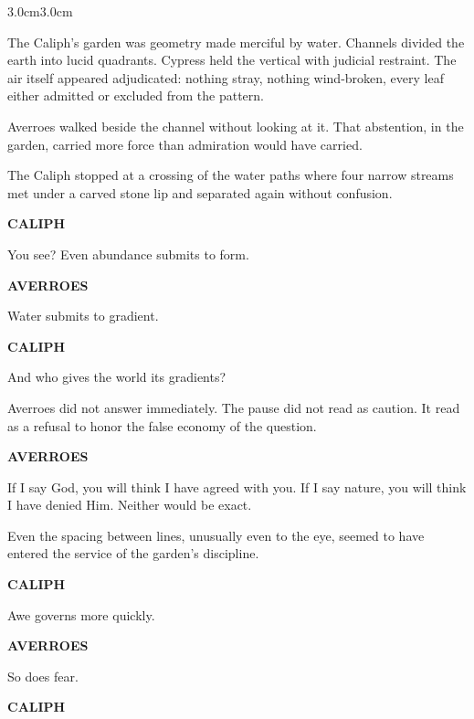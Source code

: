 \vspace{1em}

\begin{adjustwidth}{3.0cm}{3.0cm}

The Caliph's garden was geometry made merciful by water. Channels divided the earth
into lucid quadrants. Cypress held the vertical with judicial restraint. The air itself
appeared adjudicated: nothing stray, nothing wind-broken, every leaf either admitted
or excluded from the pattern.

Averroes walked beside the channel without looking at it. That abstention, in the
garden, carried more force than admiration would have carried.

The Caliph stopped at a crossing of the water paths where four narrow streams met
under a carved stone lip and separated again without confusion.

\medskip

\textbf{CALIPH}

You see? Even abundance submits to form.

\medskip

\textbf{AVERROES}

Water submits to gradient.

\medskip

\textbf{CALIPH}

And who gives the world its gradients?

\medskip

Averroes did not answer immediately. The pause did not read as caution. It read as
a refusal to honor the false economy of the question.

\medskip

\textbf{AVERROES}

If I say God, you will think I have agreed with you. If I say nature, you will think
I have denied Him. Neither would be exact.

\medskip

Even the spacing between lines, unusually even to the eye, seemed to have entered
the service of the garden's discipline.

\medskip

\textbf{CALIPH}

Awe governs more quickly.

\medskip

\textbf{AVERROES}

So does fear.

\medskip

\textbf{CALIPH}


\end{adjustwidth}
